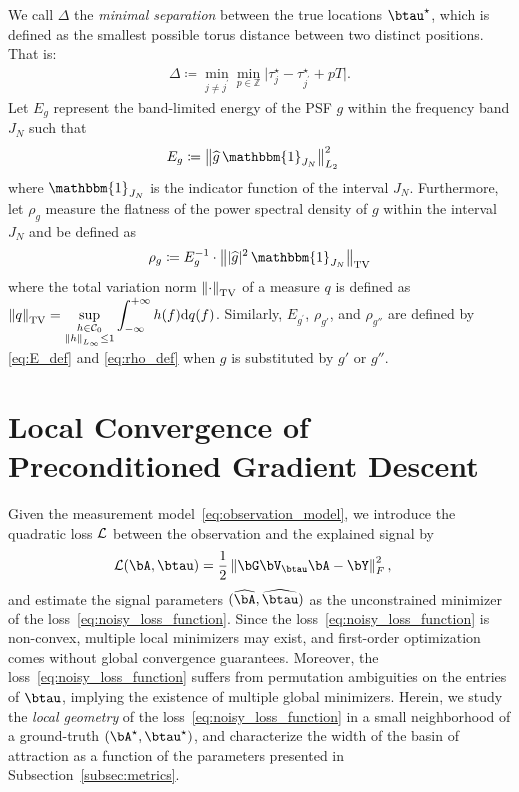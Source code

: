 \documentclass[conference,english]{IEEEtran}
\begin{document}
We call $\Delta$ the \emph{minimal separation} between the true locations $\btau^\star$, which is defined as the smallest possible torus distance between two distinct positions. That is:
\begin{align*}
    \Delta \coloneqq \min_{j \neq j^\prime} \min_{p\in \mathbb{Z}}\vert \tau^\star_{j} - \tau^\star_{j^\prime} + pT\vert.
\end{align*} 
Let $E_g$ represent the band-limited energy of the PSF $g$ within the frequency band $J_N$ such that
\begin{align}
\label{eq:E_def}
E_g &\coloneqq \norm{ \widehat{g} \,  \mathbbm{1}_{J_N}}_{L_2}^2
\end{align}
where $\mathbbm{1}_{J_N}$ is the indicator function of the interval $J_N $. Furthermore, let $\rho_g$ measure the flatness of the power spectral density of $g$ within the interval $J_N$ and be defined as
\begin{equation}\label{eq:rho_def}
    \rho_g \coloneqq E_g^{-1} \cdot \norm{|\widehat{g}|^2 \, \mathbbm{1}_{J_N}}_{\mathrm{TV}}
\end{equation}
where the total variation norm $\left\lVert \cdot \right\rVert_{\mathrm{TV}}$ of a measure $q$ is defined as
\(
    \left\lVert q \right\rVert_{\mathrm{TV}} = \displaystyle \sup_{ \substack{h \in \mathcal{C}_0 \\ \left\lVert h \right\rVert_{L_\infty} \leq 1}} \int_{-\infty}^{+\infty} h(f) \mathrm{d} q(f)
\).
Similarly, $E_{g^\prime}$, $\rho_{g'}$, and $\rho_{g''}$ are defined by \eqref{eq:E_def} and \eqref{eq:rho_def} when $g$ is substituted by $g'$ or $g''$.

\section{Local Convergence of Preconditioned Gradient Descent}\label{sec:pgd}
Given the measurement model~\eqref{eq:observation_model}, we introduce the quadratic loss $\mathcal{L}$ between the observation and the explained signal by
\begin{align}\label{eq:noisy_loss_function}
    \mathcal{L}(\bA, \btau) &= \frac 1 2 
    \left\Vert 
    \bG \bV_\btau \bA - \bY
    \right\Vert_F^2,
\end{align}
and estimate the signal parameters $(\widehat{\bA}, \widehat{\btau})$ as the unconstrained minimizer of the loss~\eqref{eq:noisy_loss_function}. 
Since the loss~\eqref{eq:noisy_loss_function} is non-convex, multiple local minimizers may exist, and first-order optimization comes without global convergence guarantees. Moreover, the loss~\eqref{eq:noisy_loss_function} suffers from permutation ambiguities on the entries of $\btau$, implying the existence of multiple global minimizers.
Herein, we study the \emph{local geometry} of the loss~\eqref{eq:noisy_loss_function} in a small neighborhood of a ground-truth $(\bA^\star, \btau^\star)$, and characterize the width of the basin of attraction as a function of the parameters presented in Subsection~\ref{subsec:metrics}.
\end{document}
